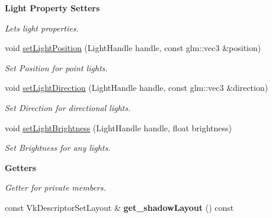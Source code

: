 \begin{Indent}\textbf{ Light Property Setters}\par
{\em Let\textquotesingle{}s light properties. }\begin{DoxyCompactItemize}
\item 
\mbox{\label{classblaze_1_1LightSystem_ad3e3a14e784c3e378e3bb5e806cb4e85}} 
void \hyperlink{classblaze_1_1LightSystem_ad3e3a14e784c3e378e3bb5e806cb4e85}{set\+Light\+Position} (Light\+Handle handle, const glm\+::vec3 \&position)
\begin{DoxyCompactList}\small\item\em Set Position for point lights. \end{DoxyCompactList}\item 
\mbox{\label{classblaze_1_1LightSystem_a2c6364e98dc7f5a90b353053503deb19}} 
void \hyperlink{classblaze_1_1LightSystem_a2c6364e98dc7f5a90b353053503deb19}{set\+Light\+Direction} (Light\+Handle handle, const glm\+::vec3 \&direction)
\begin{DoxyCompactList}\small\item\em Set Direction for directional lights. \end{DoxyCompactList}\item 
\mbox{\label{classblaze_1_1LightSystem_ad40e76076e59a3e54d10d9d2294c85d5}} 
void \hyperlink{classblaze_1_1LightSystem_ad40e76076e59a3e54d10d9d2294c85d5}{set\+Light\+Brightness} (Light\+Handle handle, float brightness)
\begin{DoxyCompactList}\small\item\em Set Brightness for any lights. \end{DoxyCompactList}\end{DoxyCompactItemize}
\end{Indent}
\begin{Indent}\textbf{ Getters}\par
{\em Getter for private members. }\begin{DoxyCompactItemize}
\item 
\mbox{\label{classblaze_1_1LightSystem_a9cfc58e4355fc347da7f800ceeacb1e4}} 
const Vk\+Descriptor\+Set\+Layout \& {\bfseries get\+\_\+shadow\+Layout} () const
\end{DoxyCompactItemize}
\end{Indent}
